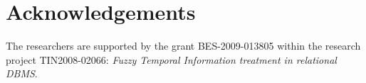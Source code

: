 \documentclass{llncs}
\begin{document}
\newpage

\section*{Acknowledgements}
%
The researchers are supported by the grant BES-2009-013805 within the research project TIN2008-02066: \emph{Fuzzy Temporal Information treatment in relational DBMS}.



\end{document}
